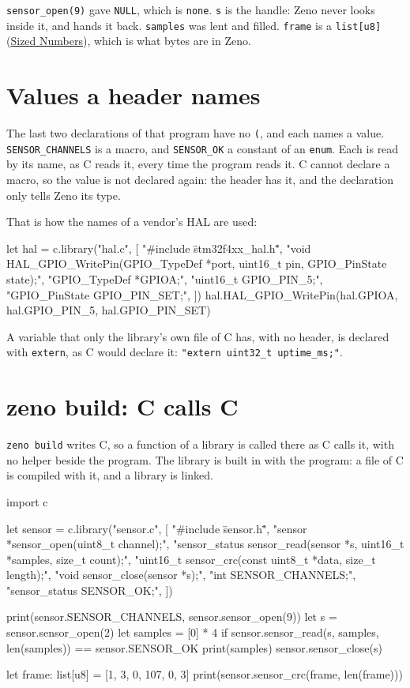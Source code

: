 \verb|sensor_open(9)| gave \verb|NULL|, which is \verb|none|. \verb|s|
is the handle: Zeno never looks inside it, and hands it back.
\verb|samples| was lent and filled. \verb|frame| is a
\verb|list[u8]| (\hyperref[ch-sized-numbers]{Sized Numbers}), which is
what bytes are in Zeno.

\section{Values a header names}

The last two declarations of that program have no \verb|(|, and each
names a value. \verb|SENSOR_CHANNELS| is a macro, and \verb|SENSOR_OK|
a constant of an \verb|enum|. Each is read by its name, as C reads it,
every time the program reads it. C cannot declare a macro, so the
value is not declared again: the header has it, and the declaration
only tells Zeno its type.

That is how the names of a vendor's HAL are used:

\begin{zenofrag}
let hal = c.library("hal.c", [
    "#include \"stm32f4xx_hal.h\"",
    "void HAL_GPIO_WritePin(GPIO_TypeDef *port, uint16_t pin, GPIO_PinState state);",
    "GPIO_TypeDef *GPIOA;",
    "uint16_t GPIO_PIN_5;",
    "GPIO_PinState GPIO_PIN_SET;",
])
hal.HAL_GPIO_WritePin(hal.GPIOA, hal.GPIO_PIN_5, hal.GPIO_PIN_SET)
\end{zenofrag}

A variable that only the library's own file of C has, with no header,
is declared with \verb|extern|, as C would declare it:
\verb|"extern uint32_t uptime_ms;"|.

\section{zeno build: C calls C}

\verb|zeno build| writes C, so a function of a library is called
there as C calls it, with no helper beside the program. The library
is built in with the program: a file of C is compiled with it, and a
library is linked.

\begin{zeno}[file=read.zeno, dir=sensor, show=no, cmd=zeno build {file} ;; ./read ;; zeno build --no-collector --minimal {file} ;; ./read ;; grep -c "" read.c ;; grep "sensor_close(" read.c]
import c

let sensor = c.library("sensor.c", [
    "#include \"sensor.h\"",
    "sensor *sensor_open(uint8_t channel);",
    "sensor_status sensor_read(sensor *s, uint16_t *samples, size_t count);",
    "uint16_t sensor_crc(const uint8_t *data, size_t length);",
    "void sensor_close(sensor *s);",
    "int SENSOR_CHANNELS;",
    "sensor_status SENSOR_OK;",
])

print(sensor.SENSOR_CHANNELS, sensor.sensor_open(9))
let s = sensor.sensor_open(2)
let samples = [0] * 4
if sensor.sensor_read(s, samples, len(samples)) == sensor.SENSOR_OK {
    print(samples)
}
sensor.sensor_close(s)

let frame: list[u8] = [1, 3, 0, 107, 0, 3]
print(sensor.sensor_crc(frame, len(frame)))
\end{zeno}

